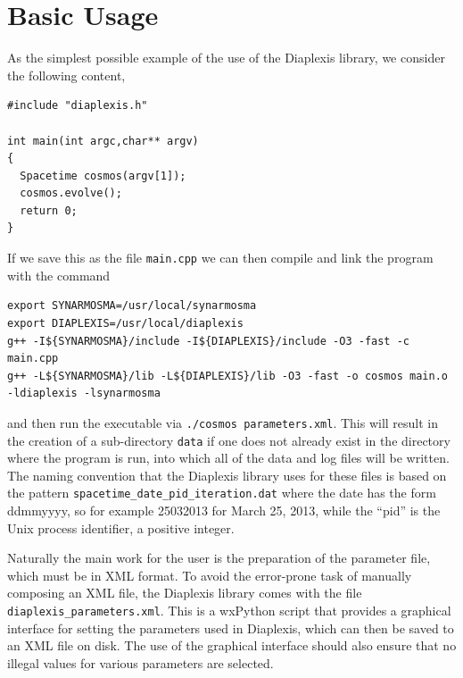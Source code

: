 \documentclass[12pt,letterpaper]{report}
\begin{document}
\section{Basic Usage}

As the simplest possible example of the use of the Diaplexis library, we consider the 
following content,
\begin{verbatim}
#include "diaplexis.h"

int main(int argc,char** argv)
{
  Spacetime cosmos(argv[1]);
  cosmos.evolve();
  return 0;
}
\end{verbatim}
If we save this as the file \texttt{main.cpp} we can then compile and link the program 
with the command
\begin{verbatim}
export SYNARMOSMA=/usr/local/synarmosma
export DIAPLEXIS=/usr/local/diaplexis
g++ -I${SYNARMOSMA}/include -I${DIAPLEXIS}/include -O3 -fast -c main.cpp 
g++ -L${SYNARMOSMA}/lib -L${DIAPLEXIS}/lib -O3 -fast -o cosmos main.o -ldiaplexis -lsynarmosma
\end{verbatim}
and then run the executable via \texttt{./cosmos parameters.xml}. This will result in the 
creation of a sub-directory \texttt{data} if one does not already exist in the directory where 
the program is run, into which all of the data and log files will be written. The naming 
convention that the Diaplexis library uses for these files is based on the pattern 
\texttt{spacetime\_date\_pid\_iteration.dat} where the date has the form ddmmyyyy, so 
for example 25032013 for March 25, 2013, while the ``pid'' is the Unix process identifier, a 
positive integer. 

Naturally the main work for the user is the preparation of the parameter file, which must 
be in XML format. To avoid the error-prone task of manually composing an XML file, the Diaplexis 
library comes with the file \texttt{diaplexis\_parameters.xml}. This is a wxPython script that 
provides a graphical interface for setting the parameters used in Diaplexis, which can then be 
saved to an XML file on disk. The use of the graphical interface should also ensure that no 
illegal values for various parameters are selected. 
\end{document}
